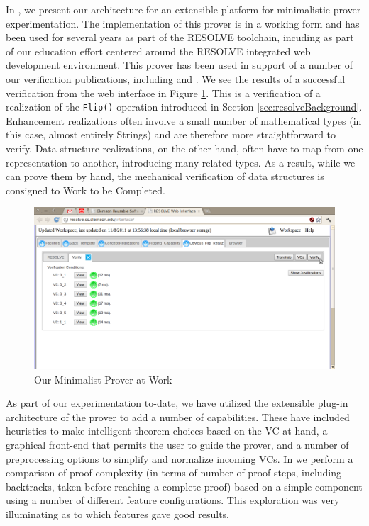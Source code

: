 In \cite{smith10}, we present our architecture for an extensible platform for minimalistic prover experimentation.  The implementation of this prover is in a working form and has been used for several years as part of the RESOLVE toolchain, incuding as part of our education effort centered around the RESOLVE integrated web development environment\cite{chuckThesis}.  This prover has been used in support of a number of our verification publications, including \cite{Sit11} and \cite{smithMinimalist}.  We see the results of a successful verification from the web interface in Figure \ref{fig:successfulverification}.  This is a verification of a realization of the \texttt{Flip()} operation introduced in Section \ref{sec:resolveBackground}.  Enhancement realizations often involve a small number of mathematical types (in this case, almost entirely Strings) and are therefore more straightforward to verify.  Data structure realizations, on the other hand, often have to map from one representation to another, introducing many related types.  As a result, while we can prove them by hand, the mechanical verification of data structures is consigned to Work to be Completed.

\begin{figure}
  \centering
    \includegraphics[width=\textwidth]{successfulverification}
  \caption{Our Minimalist Prover at Work\label{fig:successfulverification}}
\end{figure}

As part of our experimentation to-date, we have utilized the extensible plug-in architecture of the prover to add a number of capabilities.  These have included heuristics to make intelligent theorem choices based on the VC at hand, a graphical front-end that permits the user to guide the prover, and a number of preprocessing options to simplify and normalize incoming VCs.  In \cite{smithMinimalist} we perform a comparison of proof complexity (in terms of number of proof steps, including backtracks, taken before reaching a complete proof) based on a simple component using a number of different feature configurations.  This exploration was very illuminating as to which features gave good results.

